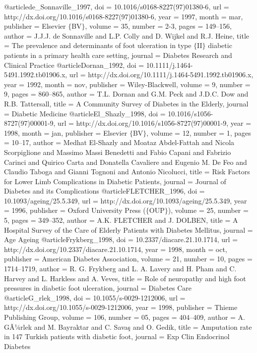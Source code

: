 @article{de_Sonnaville_1997,
	doi = {10.1016/s0168-8227(97)01380-6},
	url = {http://dx.doi.org/10.1016/s0168-8227(97)01380-6},
	year = 1997,
	month = {mar},
	publisher = {Elsevier $\lbrace$BV$\rbrace$},
	volume = {35},
	number = {2-3},
	pages = {149--156},
	author = {J.J.J. de Sonnaville and L.P. Colly and D. Wijkel and R.J. Heine},
	title = {The prevalence and determinants of foot ulceration in type $\lbrace$II$\rbrace$ diabetic patients in a primary health care setting},
	journal = {Diabetes Research and Clinical Practice}
}
@article{Dornan_1992,
	doi = {10.1111/j.1464-5491.1992.tb01906.x},
	url = {http://dx.doi.org/10.1111/j.1464-5491.1992.tb01906.x},
	year = 1992,
	month = {nov},
	publisher = {Wiley-Blackwell},
	volume = {9},
	number = {9},
	pages = {860--865},
	author = {T.L. Dornan and G.M. Peck and J.D.C. Dow and R.B. Tattersall},
	title = {A Community Survey of Diabetes in the Elderly},
	journal = {Diabetic Medicine}
}
@article{El_Shazly_1998,
	doi = {10.1016/s1056-8727(97)00001-9},
	url = {http://dx.doi.org/10.1016/s1056-8727(97)00001-9},
	year = 1998,
	month = {jan},
	publisher = {Elsevier $\lbrace$BV$\rbrace$},
	volume = {12},
	number = {1},
	pages = {10--17},
	author = {Medhat El-Shazly and Moataz Abdel-Fattah and Nicola Scorpiglione and Massimo Massi Benedetti and Fabio Capani and Fabrizio Carinci and Quirico Carta and Donatella Cavaliere and Eugenio M. De Feo and Claudio Taboga and Gianni Tognoni and Antonio Nicolucci},
	title = {Risk Factors for Lower Limb Complications in Diabetic Patients},
	journal = {Journal of Diabetes and its Complications}
}
@article{FLETCHER_1996,
	doi = {10.1093/ageing/25.5.349},
	url = {http://dx.doi.org/10.1093/ageing/25.5.349},
	year = 1996,
	publisher = {Oxford University Press ($\lbrace$OUP$\rbrace$)},
	volume = {25},
	number = {5},
	pages = {349--352},
	author = {A.K. FLETCHER and J. DOLBEN},
	title = {A Hospital Survey of the Care of Elderly Patients with Diabetes Mellitus},
	journal = {Age Ageing}
}
@article{Frykberg_1998,
	doi = {10.2337/diacare.21.10.1714},
	url = {http://dx.doi.org/10.2337/diacare.21.10.1714},
	year = 1998,
	month = {oct},
	publisher = {American Diabetes Association},
	volume = {21},
	number = {10},
	pages = {1714--1719},
	author = {R. G. Frykberg and L. A. Lavery and H. Pham and C. Harvey and L. Harkless and A. Veves},
	title = {Role of neuropathy and high foot pressures in diabetic foot ulceration},
	journal = {Diabetes Care}
}
@article{G_rlek_1998,
	doi = {10.1055/s-0029-1212006},
	url = {http://dx.doi.org/10.1055/s-0029-1212006},
	year = 1998,
	publisher = {Thieme Publishing Group},
	volume = {106},
	number = {05},
	pages = {404--409},
	author = {A. GÃ¼rlek and M. Bayraktar and C. Sava{\c{s}} and O. Gedik},
	title = {Amputation rate in 147 Turkish patients with diabetic foot},
	journal = {Exp Clin Endocrinol Diabetes}
}
